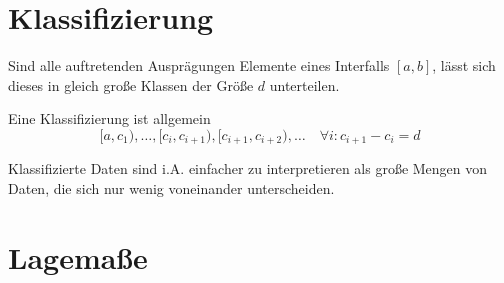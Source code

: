 \section{Klassifizierung}
Sind alle auftretenden Ausprägungen Elemente eines Interfalls $[a,b]$, lässt sich dieses in gleich große Klassen der Größe $d$ unterteilen.

Eine Klassifizierung ist allgemein
\begin{equation*}
	[a, c_1), \ldots, [c_i,c_{i+1}), [c_{i+1},c_{i+2}), \ldots\quad \forall i: c_{i+1}-c_i=d
\end{equation*}

Klassifizierte Daten sind i.A. einfacher zu interpretieren als große Mengen von Daten, die sich nur wenig voneinander unterscheiden.

\section{Lagemaße}
